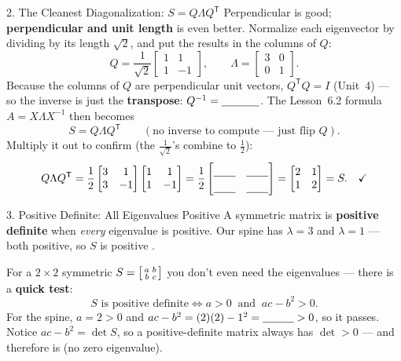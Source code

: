 \documentclass[10pt]{article}
\newcommand{\T}{\mathsf{T}}
\begin{document}
\begin{notesbox}{2. The Cleanest Diagonalization: $S=Q\Lambda Q^{\T}$}
Perpendicular is good; \textbf{perpendicular and unit length} is even better. Normalize each eigenvector by
dividing by its length $\sqrt2$, and put the results in the columns of $Q$:
\[
  Q=\frac{1}{\sqrt2}\begin{bmatrix}1&1\\1&-1\end{bmatrix},\qquad
  \Lambda=\begin{bmatrix}3&0\\0&1\end{bmatrix}.
\]
Because the columns of $Q$ are perpendicular unit vectors, $Q^{\T}Q=I$ (Unit~4) --- so the inverse is just
the \textbf{transpose}: $Q^{-1}=\blank{1.2cm}$. The Lesson~6.2 formula $A=X\Lambda X^{-1}$ then becomes
\[
  S=Q\Lambda Q^{\T}\qquad(\text{no inverse to compute --- just flip }Q).
\]
Multiply it out to confirm (the $\frac1{\sqrt2}$'s combine to $\frac12$):
\[
  Q\Lambda Q^{\T}=\frac12\begin{bmatrix}3&1\\3&-1\end{bmatrix}\begin{bmatrix}1&1\\1&-1\end{bmatrix}
  =\frac12\begin{bmatrix}\rule{0pt}{1.1em}\blank{0.7cm}&\blank{0.7cm}\\[3pt]\blank{0.7cm}&\blank{0.7cm}\end{bmatrix}
  =\begin{bmatrix}2&1\\1&2\end{bmatrix}=S.\quad\checkmark
\]
\end{notesbox}

\begin{notesbox}{3. Positive Definite: All Eigenvalues Positive}
A symmetric matrix is \textbf{positive definite} when \emph{every} eigenvalue is positive. Our spine has
$\lambda=3$ and $\lambda=1$ --- both positive, so $S$ is positive \blank{1.8cm}.

\vspace{2pt}
For a $2\times2$ symmetric $S=\begin{bsmallmatrix}a&b\\b&c\end{bsmallmatrix}$ you don't even need the
eigenvalues --- there is a \textbf{quick test}:
\[
  S\text{ is positive definite}\iff a>0 \ \text{ and }\ ac-b^2>0.
\]
For the spine, $a=2>0$ and $ac-b^2=(2)(2)-1^2=\blank{1.0cm}>0$, so it passes. Notice $ac-b^2=\det S$, so a
positive-definite matrix always has $\det>0$ --- and therefore is \blank{2.2cm} (no zero eigenvalue).
\end{notesbox}
\end{document}
